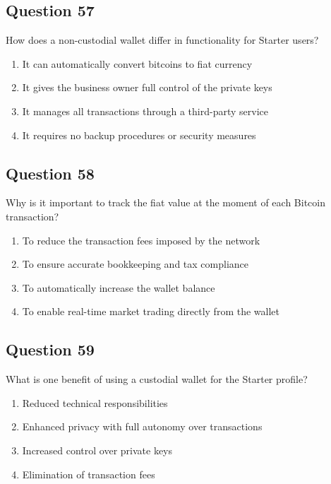 \documentclass[12pt,a4paper]{article}
\begin{document}
\bigskip


\subsection*{Question 57}
How does a non-custodial wallet differ in functionality for Starter users?

\begin{enumerate}[label=\Alph*., leftmargin=*]
\item It can automatically convert bitcoins to fiat currency
\item It gives the business owner full control of the private keys
\item It manages all transactions through a third-party service
\item It requires no backup procedures or security measures
\end{enumerate}

\bigskip


\subsection*{Question 58}
Why is it important to track the fiat value at the moment of each Bitcoin transaction?

\begin{enumerate}[label=\Alph*., leftmargin=*]
\item To reduce the transaction fees imposed by the network
\item To ensure accurate bookkeeping and tax compliance
\item To automatically increase the wallet balance
\item To enable real-time market trading directly from the wallet
\end{enumerate}

\bigskip


\subsection*{Question 59}
What is one benefit of using a custodial wallet for the Starter profile?

\begin{enumerate}[label=\Alph*., leftmargin=*]
\item Reduced technical responsibilities
\item Enhanced privacy with full autonomy over transactions
\item Increased control over private keys
\item Elimination of transaction fees
\end{enumerate}
\end{document}
